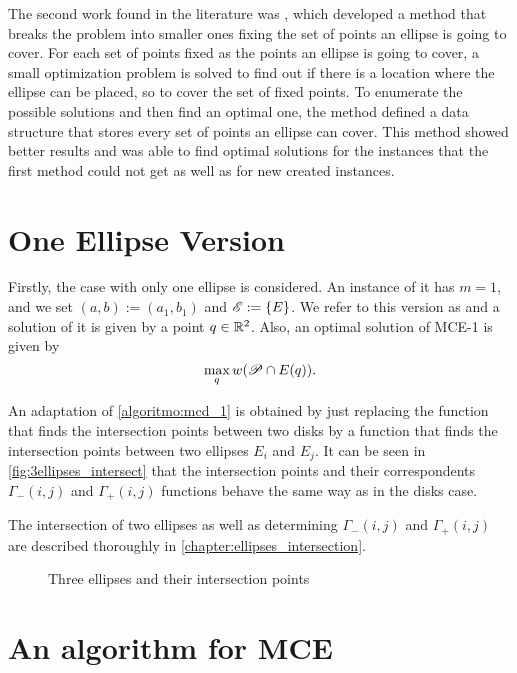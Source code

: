 The second work found in the literature was , which developed a method that breaks the problem into smaller ones fixing the set of points an ellipse is going to cover. For each set of points fixed as the points an ellipse is going to cover, a small optimization problem is solved to find out if there is a location where the ellipse can be placed, so to cover the set of fixed points. To enumerate the possible solutions and then find an optimal one, the method defined a data structure that stores every set of points an ellipse can cover. This method showed better results and was able to find optimal solutions for the instances that the first method could not get as well as for new created instances.


\section{One Ellipse Version}

Firstly, the case with only one ellipse is considered. An instance of it has $m=1$, and we set $(a, b):=(a_1, b_1)$ and $\mathscr{E} := \{E\}$. We refer to this version as  and a solution of it is given by a point $q\in\mathbb{R}^2$. Also, an optimal solution of MCE-1 is given by
\begin{equation}
\max_q w(\mathscr{P} \cap E(q)).
\end{equation}

An adaptation of \autoref{algoritmo:mcd_1} is obtained by just replacing the function that finds the intersection points between two disks by a function that finds the intersection points between two ellipses $E_i$ and $E_j$.
It can be seen in \autoref{fig:3ellipses_intersect} that the intersection points and their correspondents $\Gamma_-(i,j)$ and $\Gamma_+(i,j)$ functions behave the same way as in the disks case.

The intersection of two ellipses as well as determining $\Gamma_-(i,j)$ and $\Gamma_+(i,j)$ are described thoroughly in \autoref{chapter:ellipses_intersection}. 


\begin{figure}[H]
\centering

    \caption{Three ellipses and their intersection points}
    
    \fautor
    \label{fig:3ellipses_intersect}
\end{figure}

\section{An algorithm for MCE}

